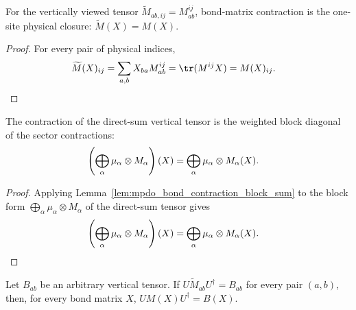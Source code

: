 \begin{lemma}
    \label{lem:mpdo_vertical_bond_contraction_phys_close}
    \leanok
    For the vertically viewed tensor
    $\widetilde M_{ab,ij}=M^{ij}_{ab}$, bond-matrix contraction is the
    one-site physical closure: $\widetilde M(X)=M(X)$.
\end{lemma}

\begin{proof}\leanok
    For every pair of physical indices,
    \begin{align}
        \widetilde M(X)_{ij}
         & =\sum_{a,b}X_{ba}M^{ij}_{ab}
        =\tr(M^{ij}X)
        =M(X)_{ij}.
        \notag
    \end{align}
\end{proof}

\begin{lemma}
    \label{lem:mpdo_vertical_bond_contraction_assembled}
    \leanok
    The contraction of the direct-sum vertical tensor is the weighted block
    diagonal of the sector contractions:
    \begin{align}
        \left(\bigoplus_\alpha\mu_\alpha\otimes M_\alpha\right)(X)
         & =\bigoplus_\alpha\mu_\alpha\otimes M_\alpha(X).
        \notag
    \end{align}
\end{lemma}

\begin{proof}\leanok
    Applying Lemma~\ref{lem:mpdo_bond_contraction_block_sum} to the block form
    $\bigoplus_\alpha\mu_\alpha\otimes M_\alpha$ of the direct-sum tensor gives
    \begin{align}
        \left(\bigoplus_\alpha\mu_\alpha\otimes M_\alpha\right)(X)
         & =\bigoplus_\alpha\mu_\alpha\otimes M_\alpha(X).
        \notag
    \end{align}
\end{proof}

\begin{lemma}
    \label{lem:mpdo_vertical_bond_contraction_forward}
    \leanok
    Let $B_{ab}$ be an arbitrary vertical tensor. If
    $U\widetilde M_{ab}U^\dagger=B_{ab}$ for every pair $(a,b)$, then, for
    every bond matrix $X$, $U M(X)U^\dagger=B(X)$.
\end{lemma}

